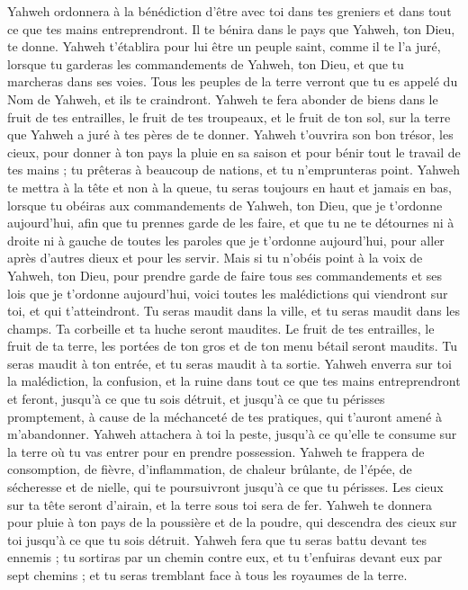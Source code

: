 \begin{multicols}{2}
Yahweh ordonnera à la bénédiction d’être avec toi dans tes greniers et dans tout ce que tes mains entreprendront. Il te bénira dans le pays que Yahweh, ton Dieu, te donne.
Yahweh t'établira pour lui être un peuple saint, comme il te l'a juré, lorsque tu garderas les commandements de Yahweh, ton Dieu, et que tu marcheras dans ses voies.
Tous les peuples de la terre verront que tu es appelé du Nom de Yahweh, et ils te craindront.
Yahweh te fera abonder de biens dans le fruit de tes entrailles, le fruit de tes troupeaux, et le fruit de ton sol, sur la terre que Yahweh a juré à tes pères de te donner.
Yahweh t'ouvrira son bon trésor, les cieux, pour donner à ton pays la pluie en sa saison et pour bénir tout le travail de tes mains ; tu prêteras à beaucoup de nations, et tu n'emprunteras point.
Yahweh te mettra à la tête et non à la queue, tu seras toujours en haut et jamais en bas, lorsque tu obéiras aux commandements de Yahweh, ton Dieu, que je t’ordonne aujourd'hui, afin que tu prennes garde de les faire,
et que tu ne te détournes ni à droite ni à gauche de toutes les paroles que je t’ordonne aujourd'hui, pour aller après d'autres dieux et pour les servir.
Mais si tu n'obéis point à la voix de Yahweh, ton Dieu, pour prendre garde de faire tous ses commandements et ses lois que je t’ordonne aujourd'hui, voici toutes les malédictions qui viendront sur toi, et qui t'atteindront.
Tu seras maudit dans la ville, et tu seras maudit dans les champs.
Ta corbeille et ta huche seront maudites.
Le fruit de tes entrailles, le fruit de ta terre, les portées de ton gros et de ton menu bétail seront maudits.
Tu seras maudit à ton entrée, et tu seras maudit à ta sortie.
Yahweh enverra sur toi la malédiction, la confusion, et la ruine dans tout ce que tes mains entreprendront et feront, jusqu'à ce que tu sois détruit, et jusqu’à ce que tu périsses promptement, à cause de la méchanceté de tes pratiques, qui t’auront amené à m’abandonner.
Yahweh attachera à toi la peste, jusqu'à ce qu'elle te consume sur la terre où tu vas entrer pour en prendre possession.
Yahweh te frappera de consomption, de fièvre, d’inflammation, de chaleur brûlante, de l’épée, de sécheresse et de nielle, qui te poursuivront jusqu'à ce que tu périsses.
Les cieux sur ta tête seront d'airain, et la terre sous toi sera de fer.
Yahweh te donnera pour pluie à ton pays de la poussière et de la poudre, qui descendra des cieux sur toi jusqu'à ce que tu sois détruit.
Yahweh fera que tu seras battu devant tes ennemis ; tu sortiras par un chemin contre eux, et tu t'enfuiras devant eux par sept chemins ; et tu seras tremblant face à tous les royaumes de la terre.

\end{multicols}

